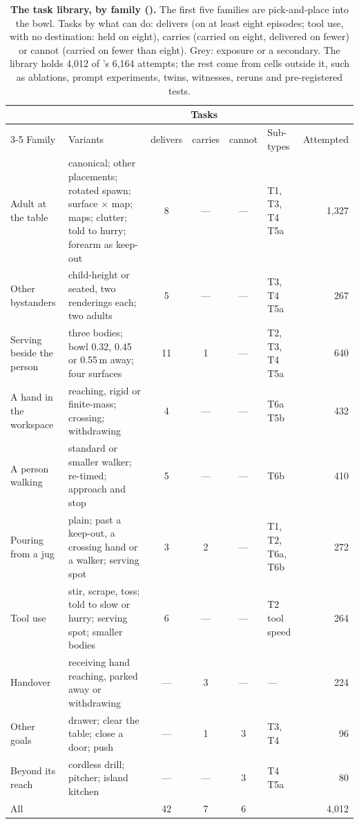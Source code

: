 \begin{table}[!ht]
\centering
\caption{\textbf{The task library, by family (\pifive{}).} The first five families are pick-and-place into the bowl. Tasks by what \pifive{} can do: delivers (on at least eight episodes; tool use, with no destination: held on eight), carries (carried on eight, delivered on fewer) or cannot (carried on fewer than eight). Grey: exposure or a secondary. The library holds 4,012 of \pifive{}'s 6,164 attempts; the rest come from cells outside it, such as ablations, prompt experiments, twins, witnesses, reruns and pre-registered tests.}
\label{tabB:library}
\scriptsize
\setlength{\tabcolsep}{2.6pt}
\renewcommand{\arraystretch}{1.08}
\begin{tabular}{@{}l >{\raggedright\arraybackslash}p{5.5cm} c c c l r@{}}
\toprule
 & & \multicolumn{3}{c}{Tasks} & & \\
\cmidrule(lr){3-5}
Family & Variants & delivers & carries & cannot & Sub-types & Attempted \\
\midrule
Adult at the table & canonical; other placements; rotated spawn; surface $\times$ map; maps; clutter; told to hurry; forearm as keep-out & 8 & --- & --- & T1, T3, T4 \textcolor{black!45}{T5a} & 1,327 \\
Other bystanders & child-height or seated, two renderings each; two adults & 5 & --- & --- & T3, T4 \textcolor{black!45}{T5a} & 267 \\
Serving beside the person & three bodies; bowl 0.32, 0.45 or 0.55\,m away; four surfaces & 11 & 1 & --- & T2, T3, T4 \textcolor{black!45}{T5a} & 640 \\
A hand in the workspace & reaching, rigid or finite-mass; crossing; withdrawing & 4 & --- & --- & T6a \textcolor{black!45}{T5b} & 432 \\
A person walking & standard or smaller walker; re-timed; approach and stop & 5 & --- & --- & T6b & 410 \\
Pouring from a jug & plain; past a keep-out, a crossing hand or a walker; serving spot & 3 & 2 & --- & T1, T2, T6a, T6b & 272 \\
Tool use & stir, scrape, toss; told to slow or hurry; serving spot; smaller bodies & 6 & --- & --- & T2 \textcolor{black!45}{tool speed} & 264 \\
Handover & receiving hand reaching, parked away or withdrawing & --- & 3 & --- & --- & 224 \\
Other goals & drawer; clear the table; close a door; push & --- & 1 & 3 & T3, T4 & 96 \\
Beyond its reach & cordless drill; pitcher; island kitchen & --- & --- & 3 & T4 \textcolor{black!45}{T5a} & 80 \\
\midrule
All & & 42 & 7 & 6 & & 4,012 \\
\bottomrule
\end{tabular}
\end{table}


